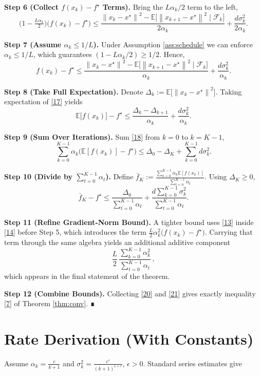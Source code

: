 \documentclass{article}
\newcommand{\E}{\mathbb{E}}
\newcommand{\norm}[1]{\left\|#1\right\|}
\begin{document}
\noindent\textbf{Step 6 (Collect $f(x_k)-f^\star$ Terms).}  
Bring the $L\alpha_k/2$ term to the left,
\[
\bigl(1-\tfrac{L\alpha_k}{2}\bigr)\bigl(f(x_k)-f^\star\bigr)
\le \frac{\norm{x_k-x^\star}^{2}-\E\!\bigl[\norm{x_{k+1}-x^\star}^{2}\mid\mathcal F_k\bigr]}{2\alpha_k}
+\frac{d\sigma_k^{2}}{2\alpha_k}. \tag{16}
\]

\noindent\textbf{Step 7 (Assume $\alpha_k\le 1/L$).}  
Under Assumption \ref{ass:schedule} we can enforce $\alpha_k\le 1/L$, which guarantees $(1-L\alpha_k/2)\ge 1/2$. Hence,
\[
f(x_k)-f^\star
\le \frac{\norm{x_k-x^\star}^{2}-\E\!\bigl[\norm{x_{k+1}-x^\star}^{2}\mid\mathcal F_k\bigr]}{\alpha_k}
+\frac{d\sigma_k^{2}}{\alpha_k}. \tag{17}
\]

\noindent\textbf{Step 8 (Take Full Expectation).}  
Denote $\Delta_k:=\E\!\bigl[\norm{x_k-x^\star}^{2}\bigr]$. Taking expectation of \eqref{17} yields
\[
\E\!\bigl[f(x_k)\bigr]-f^\star
\le \frac{\Delta_k-\Delta_{k+1}}{\alpha_k}
+\frac{d\sigma_k^{2}}{\alpha_k}. \tag{18}
\]

\noindent\textbf{Step 9 (Sum Over Iterations).}  
Sum \eqref{18} from $k=0$ to $k=K-1$,
\[
\sum_{k=0}^{K-1}\alpha_k\bigl(\E[f(x_k)]-f^\star\bigr)
\le \Delta_0-\Delta_K+\sum_{k=0}^{K-1}d\sigma_k^{2}. \tag{19}
\]

\noindent\textbf{Step 10 (Divide by $\sum_{t=0}^{K-1}\alpha_t$).}  
Define $\bar f_K:=\frac{\sum_{k=0}^{K-1}\alpha_k\E[f(x_k)]}{\sum_{t=0}^{K-1}\alpha_t}$. Using $\Delta_K\ge0$,
\[
\bar f_K-f^\star
\le \frac{\Delta_0}{\sum_{t=0}^{K-1}\alpha_t}
+\frac{d\sum_{k=0}^{K-1}\sigma_k^{2}}{\sum_{t=0}^{K-1}\alpha_t}. \tag{20}
\]

\noindent\textbf{Step 11 (Refine Gradient‑Norm Bound).}  
A tighter bound uses \eqref{13} inside \eqref{14} before Step 5, which introduces the term $\frac{L}{2}\alpha_k^2\bigl(f(x_k)-f^\star\bigr)$. Carrying that term through the same algebra yields an additional additive component
\[
\frac{L}{2}\,\frac{\sum_{k=0}^{K-1}\alpha_k^{2}}{\sum_{t=0}^{K-1}\alpha_t}\,,
\tag{21}
\]
which appears in the final statement of the theorem.

\noindent\textbf{Step 12 (Combine Bounds).}  
Collecting \eqref{20} and \eqref{21} gives exactly inequality \eqref{7} of Theorem \ref{thm:conv}. ∎

\section*{Rate Derivation (With Constants)}
Assume $\alpha_k=\frac{c}{k+1}$ and $\sigma_k^{2}= \frac{c'}{(k+1)^{1+\epsilon}}$, $\epsilon>0$.  
Standard series estimates give  
\end{document}
